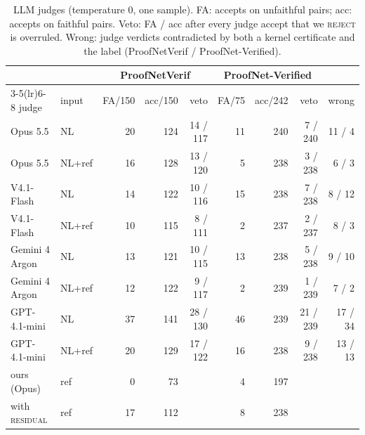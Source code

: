 \documentclass[10pt]{article}
\theoremstyle{definition}
\newcommand{\V}[1]{\textsc{#1}}
\begin{document}
\begin{table}[t]
\centering\small
\begin{tabular}{llrrrrrrr}
\toprule
& & \multicolumn{3}{c}{ProofNetVerif} & \multicolumn{3}{c}{ProofNet-Verified} & \\
\cmidrule(lr){3-5}\cmidrule(lr){6-8}
judge & input & FA/150 & acc/150 & veto & FA/75 & acc/242 & veto & wrong\\
\midrule
Opus 5.5 & NL & 20 & 124 & 14 / 117 & 11 & 240 & 7 / 240 & 11 / 4\\
Opus 5.5 & NL+ref & 16 & 128 & 13 / 120 & 5 & 238 & 3 / 238 & 6 / 3\\
V4.1-Flash & NL & 14 & 122 & 10 / 116 & 15 & 238 & 7 / 238 & 8 / 12\\
V4.1-Flash & NL+ref & 10 & 115 & 8 / 111 & 2 & 237 & 2 / 237 & 8 / 3\\
Gemini 4 Argon & NL & 13 & 121 & 10 / 115 & 13 & 238 & 5 / 238 & 9 / 10\\
Gemini 4 Argon & NL+ref & 12 & 122 & 9 / 117 & 2 & 239 & 1 / 239 & 7 / 2\\
GPT-4.1-mini & NL & 37 & 141 & 28 / 130 & 46 & 239 & 21 / 239 & 17 / 34\\
GPT-4.1-mini & NL+ref & 20 & 129 & 17 / 122 & 16 & 238 & 9 / 238 & 13 / 13\\
\midrule
ours (Opus) & ref & 0 & 73 & & 4 & 197 & & \\
\quad with \V{residual} & ref & 17 & 112 & & 8 & 238 & & \\
\bottomrule
\end{tabular}
\caption{LLM judges (temperature 0, one sample). FA: accepts on unfaithful pairs; acc: accepts on
faithful pairs. Veto: FA / acc after every judge accept that we \V{reject} is overruled. Wrong:
judge verdicts contradicted by both a kernel certificate and the label (ProofNetVerif /
ProofNet-Verified).}
\label{tab:judge}
\end{table}
\end{document}
